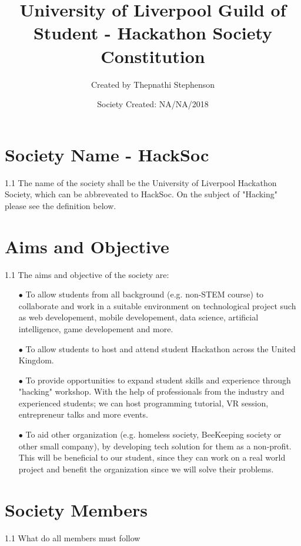 \documentclass[10pt, a4paper, onecolumn]{report}
\title{University of Liverpool Guild of Student - Hackathon Society Constitution}
\author{Created by Thepnathi Stephenson}
\date{Society Created: NA/NA/2018}
\begin{document}
  
  \maketitle
  
  \section{Society Name - HackSoc}
  1.1 The name of the society shall be the University of Liverpool Hackathon Society, 
  which can be abbreveated to HackSoc. 
  On the subject of "Hacking" please see the definition below.
  
  \section{Aims and Objective}
  1.1 The aims and objective of the society are:
  \begin{itemize}
    \item[$\bullet$]To allow students from all background (e.g. non-STEM course)
     to collaborate and work in a suitable environment on technological project such as web developement,
      mobile developement, data science, artificial intelligence, game developement and more.
    
    \item[$\bullet$] To allow students to host and attend student Hackathon across the United Kingdom.
    
    \item[$\bullet$] To provide opportunities to expand student skills and experience through
     "hacking" workshop. With the help of professionals from the industry and experienced students;
      we can host programming tutorial, VR session, entrepreneur talks and more events.
     
    \item[$\bullet$] To aid other organization (e.g. homeless society, BeeKeeping society or other small company),
     by developing tech solution for them as a non-profit. This will be beneficial to our student, since they can work on a real world project and benefit the organization since we will solve their problems.
  \end{itemize}
  
  
  \section{Society Members}
  1.1 What do all members must follow
  
\end{document}
